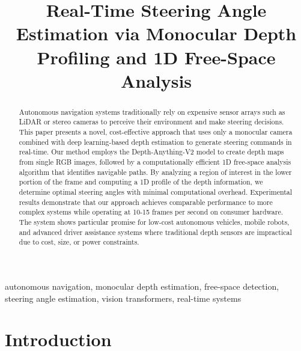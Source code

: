 \documentclass[conference]{IEEEtran}
\begin{document}
\title{Real-Time Steering Angle Estimation via Monocular Depth Profiling and 1D Free-Space Analysis}

\author{
\and
{}
}

\maketitle

\begin{abstract}
Autonomous navigation systems traditionally rely on expensive sensor arrays such as LiDAR or stereo cameras to perceive their environment and make steering decisions. This paper presents a novel, cost-effective approach that uses only a monocular camera combined with deep learning-based depth estimation to generate steering commands in real-time. Our method employs the Depth-Anything-V2 model to create depth maps from single RGB images, followed by a computationally efficient 1D free-space analysis algorithm that identifies navigable paths. By analyzing a region of interest in the lower portion of the frame and computing a 1D profile of the depth information, we determine optimal steering angles with minimal computational overhead. Experimental results demonstrate that our approach achieves comparable performance to more complex systems while operating at 10-15 frames per second on consumer hardware. The system shows particular promise for low-cost autonomous vehicles, mobile robots, and advanced driver assistance systems where traditional depth sensors are impractical due to cost, size, or power constraints.
\end{abstract}

\begin{IEEEkeywords}
autonomous navigation, monocular depth estimation, free-space detection, steering angle estimation, vision transformers, real-time systems
\end{IEEEkeywords}

\section{Introduction}
\end{document}
